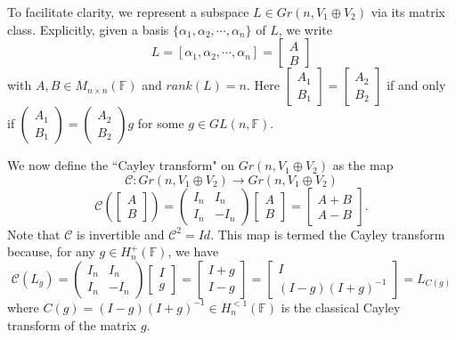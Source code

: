 \documentclass{article}
\begin{document}
To facilitate clarity, we represent a subspace $L \in Gr(n,  V_1\oplus V_2)$ via its matrix class. Explicitly, given a basis $\{\alpha_1, \alpha_2, \cdots, \alpha_n\}$ of $L$, we write
\[
L=[\alpha_1, \alpha_2, \cdots, \alpha_n]=\left[
\begin{array}{cc}
A \\
B \end{array} \right]
\]
with $A,B \in M_{n \times n}(\mathbb{F})$ and $rank(L)=n$. Here $\left[
\begin{array}{cc}
A_1 \\
B_1 \end{array} \right]=\left[
\begin{array}{cc}
A_2 \\
B_2 \end{array} \right]$ if and only if $\left(
\begin{array}{cc}
A_1 \\
B_1 \end{array} \right)=\left(
\begin{array}{cc}
A_2 \\
B_2 \end{array} \right)g$ for some $g \in GL(n, \mathbb{F})$.


We now define the ``Cayley transform" on  $Gr(n,  V_1\oplus V_2)$ as the map
\[
\mathcal{C}: Gr(n, V_1\oplus V_2) \rightarrow Gr(n, V_1\oplus V_2)
\]
\[
\mathcal{C}(\left[
\begin{array}{cc}
A \\
B \end{array} \right])=\left(
\begin{array}{cc}
I_n  &  I_n\\
I_n  & -I_n\end{array} \right)\left[
\begin{array}{cc}
A \\
B \end{array} \right]=\left[
\begin{array}{cc}
A+B \\
A-B \end{array} \right].
\]
Note that $ \mathcal{C}$ is invertible and $\mathcal{C}^2=Id$. This map is termed the Cayley transform because, for any
$g \in H_n^{+}(\mathbb{F})$, we have
\[
\mathcal{C}(L_g)=\left(
\begin{array}{cc}
I_n  &  I_n\\
I_n  & -I_n\end{array} \right)\left[
\begin{array}{cc}
I \\
g \end{array} \right]=\left[
\begin{array}{cc}
I+g \\
I-g \end{array} \right]=\left[
\begin{array}{cc}
I \\
(I-g)(I+g)^{-1} \end{array} \right]=L_{C(g)}
\]
where $C(g)=(I-g)(I+g)^{-1} \in H_n^{<1}(\mathbb{F})$  is the classical Cayley transform of the matrix $g$.
\end{document}
